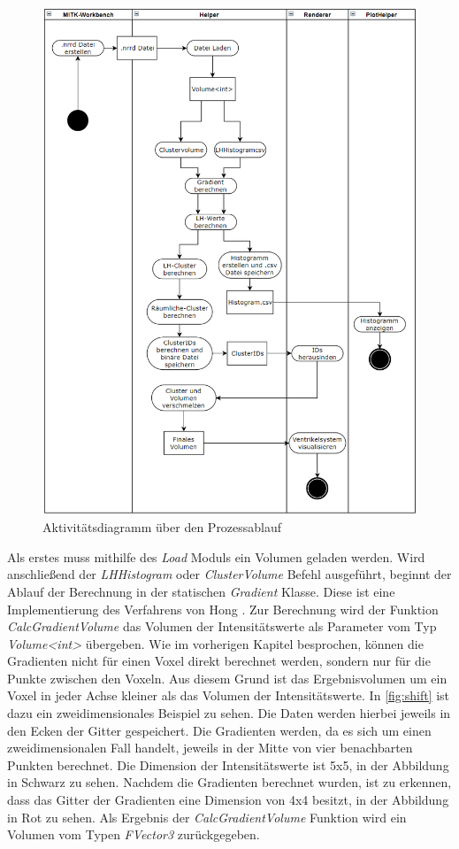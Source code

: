 \begin{figure}
\centering 
\includegraphics[width=\textwidth]{Logos/Ueberblick2.png}
\caption{Aktivitätsdiagramm über den Prozessablauf} 
\label{fig:ueberblick} 
\end{figure}


Als erstes muss mithilfe des \textit{Load} Moduls ein Volumen geladen werden. Wird anschließend der \textit{LHHistogram} oder \textit{ClusterVolume} Befehl ausgeführt, beginnt der Ablauf der Berechnung in der statischen \textit{Gradient} Klasse.
Diese ist eine Implementierung des Verfahrens von Hong \cite{hong2003method}. Zur Berechnung wird der Funktion \textit{CalcGradientVolume} das Volumen der Intensitätswerte als Parameter vom Typ \textit{Volume<int>} übergeben. Wie im vorherigen Kapitel besprochen, können die Gradienten nicht für einen Voxel direkt berechnet werden, sondern nur für die Punkte zwischen den Voxeln. Aus diesem Grund ist das Ergebnisvolumen um ein Voxel in jeder Achse kleiner als das Volumen der Intensitätswerte.
\newline
In \autoref{fig:shift} ist dazu ein zweidimensionales Beispiel zu sehen. Die Daten werden hierbei jeweils in den Ecken der Gitter gespeichert. Die Gradienten werden, da es sich um einen zweidimensionalen Fall handelt, jeweils in der Mitte von vier benachbarten Punkten berechnet.
Die Dimension der Intensitätswerte ist 5x5, in der Abbildung in Schwarz zu sehen. Nachdem die Gradienten berechnet wurden, ist zu erkennen, dass das Gitter der Gradienten eine Dimension von 4x4 besitzt, in der Abbildung in Rot zu sehen.
Als Ergebnis der \textit{CalcGradientVolume} Funktion wird ein Volumen vom Typen \textit{FVector3} zurückgegeben.


